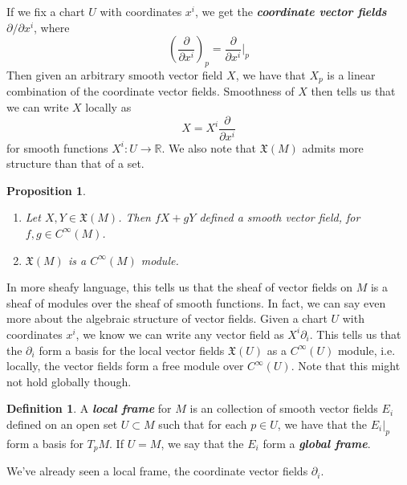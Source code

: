 \documentclass[psamsfonts]{amsart}
\newtheorem{prop}[thm]{Proposition}
\theoremstyle{definition}
\newtheorem{defn}[thm]{Definition}
\theoremstyle{remark}
\newcommand{\R}{\mathbb{R}}
\newcommand{\ib}[1]{\textbf{\textit{#1}}}
\newcommand{\enumbreak}{\ \\ \vspace{-\baselineskip}}
\begin{document}
If we fix a chart $U$ with coordinates $x^i$, we get the \ib{coordinate vector fields}
$\partial / \partial x^i$, where
\[
\left( \frac{\partial}{\partial x^i} \right)_p = \frac{\partial}{\partial x^i}\bigg\vert_p
\]
Then given an arbitrary smooth vector field $X$, we have that $X_p$ is a linear
combination of the coordinate vector fields. Smoothness of $X$ then tells us
that we can write $X$ locally as
\[
X = X^i\frac{\partial}{\partial x^i}
\]
for smooth functions $X^i : U \to \R$. We also note that $\mathfrak{X}(M)$
admits more structure than that of a set.
%
\begin{prop} \enumbreak
\begin{enumerate}
  \item Let $X,Y \in \mathfrak{X}(M)$. Then $fX + gY$ defined a smooth vector
  field, for $f,g \in C^\infty(M)$.
  \item $\mathfrak{X}(M)$ is a $C^\infty(M)$ module.
\end{enumerate}
\end{prop}
%
In more sheafy language, this tells us that the sheaf of vector fields on $M$ is a
sheaf of modules over the sheaf of smooth functions.  In fact, we can say even
more about the algebraic structure of vector fields. Given a chart $U$ with
coordinates $x^i$, we know we can write any vector field as $X^i\partial_i$.
This tells us that the $\partial_i$ form a basis for the local vector fields
$\mathfrak{X}(U)$ as a $C^\infty(U)$ module, i.e. locally, the vector fields
form a free module over $C^\infty(U)$. Note that this might not hold globally
though.
%
\begin{defn}
A \ib{local frame} for $M$ is an collection of smooth vector fields $E_i$ defined
on an open set $U \subset M$ such that for each $p \in U$, we have that the
$E_i\vert_p$ form a basis for $T_pM$. If $U = M$, we say that the $E_i$
form a \ib{global frame}.
\end{defn}
%
We've already seen a local frame, the coordinate vector fields $\partial_i$. \\
\end{document}
